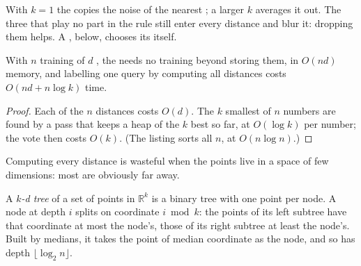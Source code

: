 \label{out:b2:trees-and-clustering:knn}

With $k = 1$ the  copies the noise of the nearest ; a larger $k$ averages it out. The three 
that play no part in the rule still enter every distance and blur it: dropping them helps. A , below,
chooses its  itself.

\begin{proposition}\label{prop:b2:trees-and-clustering:knn-cost}
With $n$ training  of $d$ , the  needs no training beyond storing them, in $O(nd)$ memory, and
labelling one query by computing all distances costs $O(nd + n \log k)$ time.
\end{proposition}

\begin{proof}
Each of the $n$ distances costs $O(d)$. The $k$ smallest of $n$ numbers are found by a pass that keeps a heap of the $k$
best so far, at $O(\log k)$ per number; the vote then costs $O(k)$. (The listing sorts all $n$, at $O(n \log n)$.)
\end{proof}

Computing every distance is wasteful when the points live in a space of few dimensions: most are obviously far away.

\begin{definition}[$k$-d tree]\label{def:b2:trees-and-clustering:kd-tree}
A \emph{$k$-d tree} of a set of points in $\mathbb{R}^k$ is a binary tree with one point per
node. A node at depth $i$ splits on coordinate $i \bmod k$: the points of its left subtree have that coordinate at most
the node's, those of its right subtree at least the node's. Built by medians, it takes the point of median coordinate as
the node, and so has depth $\lfloor \log_2 n \rfloor$.
\end{definition}

